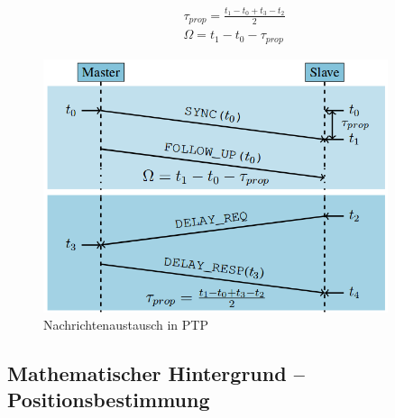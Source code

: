 \begin{equation}\label{eq:formel_ptp}
\begin{split}
\tau_{prop} = \frac{t_{1} - t_{0} + t_{3} - t_{2}}{2}
\\
\Omega = t_{1} - t_{0} - \tau_{prop}
\end{split}
\end{equation}

\begin{figure}[H]
        \centering
        \includegraphics[width=0.9\textwidth]{images/ptp.png}
        \caption{Nachrichtenaustausch in PTP}
        \label{img:ptp}
\end{figure}

\subsection{Mathematischer Hintergrund -- Positionsbestimmung}

